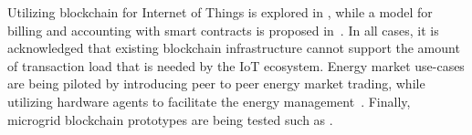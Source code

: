 Utilizing blockchain for Internet of Things is explored in \cite{iot, integrationiot}, while a model for billing and accounting with smart contracts is proposed in~\cite{billaccount}. In all cases, it is acknowledged that existing blockchain infrastructure cannot support the amount of transaction load that is needed by the IoT ecosystem. Energy market use-cases are being piloted by introducing peer to peer energy market trading, while utilizing hardware agents to facilitate the energy management~\cite{gridplus, powerledger}. Finally, microgrid blockchain prototypes are being tested such as \cite{brooklyn, DBLP:journals/ife/MengelkampNBDW18}.
